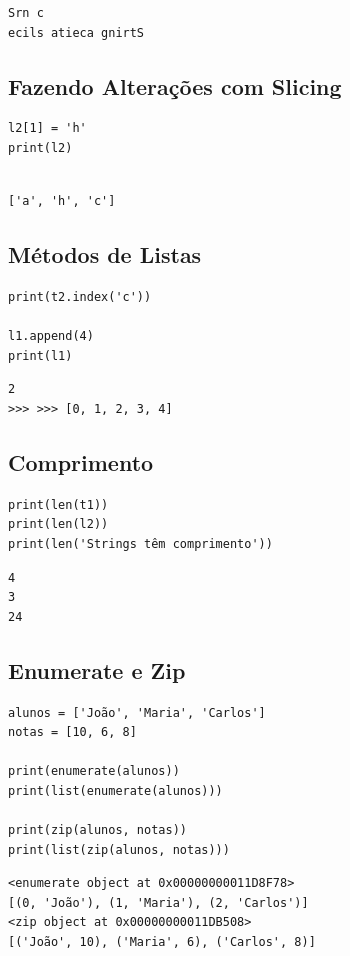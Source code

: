 \documentclass[presentation]{beamer}
\begin{document}
\begin{verbatim}
Srn c
ecils atieca gnirtS
\end{verbatim}


\subsection{Fazendo Alterações com Slicing}
\label{sec:orgheadline50}
\begin{verbatim}
l2[1] = 'h'
print(l2)
\end{verbatim}

\begin{verbatim}

['a', 'h', 'c']
\end{verbatim}
\subsection{Métodos de Listas}
\label{sec:orgheadline51}
\begin{verbatim}
print(t2.index('c'))

l1.append(4)
print(l1)
\end{verbatim}

\begin{verbatim}
2
>>> >>> [0, 1, 2, 3, 4]
\end{verbatim}

\subsection{Comprimento}
\label{sec:orgheadline52}
\begin{verbatim}
print(len(t1))
print(len(l2)) 
print(len('Strings têm comprimento'))
\end{verbatim}

\begin{verbatim}
4
3
24
\end{verbatim}
\subsection{Enumerate e Zip}
\label{sec:orgheadline53}
\begin{verbatim}
alunos = ['João', 'Maria', 'Carlos']
notas = [10, 6, 8]

print(enumerate(alunos))
print(list(enumerate(alunos)))

print(zip(alunos, notas))
print(list(zip(alunos, notas)))
\end{verbatim}

\begin{verbatim}
<enumerate object at 0x00000000011D8F78>
[(0, 'João'), (1, 'Maria'), (2, 'Carlos')]
<zip object at 0x00000000011DB508>
[('João', 10), ('Maria', 6), ('Carlos', 8)]
\end{verbatim}
\end{document}
